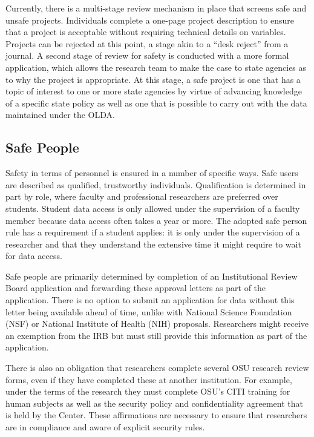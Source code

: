 Currently, there is a multi-stage review mechanism in place that screens safe and unsafe projects. Individuals complete a one-page project description to ensure that a project is acceptable without requiring technical details on variables. Projects can be rejected at this point, a stage akin to a ``desk reject'' from a journal. A second stage of review for safety is conducted with a more formal application, which allows the research team to make the case to state agencies as to why the project is appropriate. At this stage, a safe project is one that has a topic of interest to one or more state agencies by virtue of advancing knowledge of a specific state policy as well as one that is possible to carry out with the data maintained under the OLDA.

\hypertarget{safe-people-1}{%
\subsection{Safe People}\label{safe-people-1}}

Safety in terms of personnel is ensured in a number of specific ways. Safe users are described as qualified, trustworthy individuals. Qualification is determined in part by role, where faculty and professional researchers are preferred over students. Student data access is only allowed under the supervision of a faculty member because data access often takes a year or more. The adopted safe person rule has a requirement if a student applies: it is only under the supervision of a researcher and that they understand the extensive time it might require to wait for data access.

Safe people are primarily determined by completion of an Institutional Review Board application and forwarding these approval letters as part of the application. There is no option to submit an application for data without this letter being available ahead of time, unlike with National Science Foundation (NSF) or National Institute of Health (NIH) proposals. Researchers might receive an exemption from the IRB but must still provide this information as part of the application.

There is also an obligation that researchers complete several OSU research review forms, even if they have completed these at another institution. For example, under the terms of the research they must complete OSU's CITI training for human subjects as well as the security policy and confidentiality agreement that is held by the Center. These affirmations are necessary to ensure that researchers are in compliance and aware of explicit security rules.

